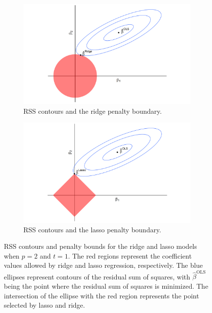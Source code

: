 \documentclass{article}
\begin{document}
\begin{figure}[!b]
	\centering
	\begin{subfigure}[b]{0.45\textwidth}
		\includegraphics[width=\textwidth]{images/ridge-diagram.png}
		\captionsetup{width = 0.8\textwidth}
		\caption{RSS contours and the ridge penalty boundary.}
		\label{fig:ridge-diagram}
	\end{subfigure}
	\hspace{30pt}
	\begin{subfigure}[b]{0.45\textwidth}
		\includegraphics[width=\textwidth]{images/lasso-diagram.png}
		\captionsetup{width = 0.8\textwidth}
		\caption{RSS contours and the lasso penalty boundary.}
		\label{fig:lasso-diagram}
	\end{subfigure}
	\captionsetup{width = 0.9\textwidth}
	\caption{RSS contours and penalty bounds for the ridge and lasso models when $p=2$ and $t = 1$. The red regions represent the coefficient values allowed by ridge and lasso regression, respectively. The blue ellipses represent contours of the residual sum of squares, with $\hat{\beta}^{\text{OLS}}$ being the point where the residual sum of squares is minimized. The intersection of the ellipse with the red region represents the point selected by lasso and ridge.}
	\label{fig:ridge-lasso-diagram}
\end{figure}
\end{document}
